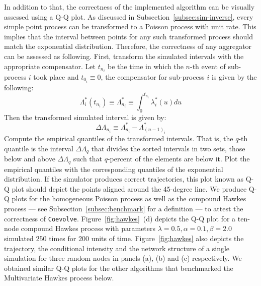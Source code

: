 \documentclass{juliacon}
\numberwithin{equation}{section}
\begin{document}
In addition to that, the correctness of the implemented algorithm can be visually assessed using a Q-Q plot. As discussed in Subsection~\ref{subsec:sim-inverse}, every simple point process can be transformed to a Poisson process with unit rate. This implies that the interval between points for any such transformed process should match the exponential distribution. Therefore, the correctness of any aggregator can be assessed as following. First, transform the simulated intervals with the appropriate compensator. Let \( t_{n_i} \) be the time in which the \( n \)-th event of sub-process \( i \) took place and \( t_{0_i} \equiv 0 \), the compensator for sub-process \( i \) is given by the following:
\begin{equation}
  \Lambda_i^\ast(t_{n_i}) \equiv \Lambda_{n_i}^\ast \equiv \int_0^{t_{n_i}} \lambda_i^\ast(u) du
\end{equation}
Then the transformed simulated interval is given by:
\begin{equation}
  \Delta \Lambda_{n_i} \equiv \Lambda_{n_i}^\ast - \Lambda_{(n-1)_i}^\ast
\end{equation}
Compute the empirical quantiles of the transformed intervals. That is, the \( q \)-th quantile is the interval \( \Delta \Lambda_q \) that divides the sorted intervals in two sets, those below and above \( \Delta \Lambda_q \) such that \( q \)-percent of the elements are below it. Plot the empirical quantiles with the corresponding quantiles of the exponential distribution. If the simulator produces correct trajectories, this plot known as Q-Q plot should depict the points aligned around the 45-degree line. We produce Q-Q plots for the homogeneous Poisson process as well as the compound Hawkes process --- see Subsection~\ref{subsec:benchmark} for a definition --- to attest the correctness of \texttt{Coevolve}. Figure~\ref{fig:hawkes}~(d) depicts the Q-Q plot for a ten-node compound Hawkes process with parameters \( \lambda = 0.5 , \alpha = 0.1 , \beta = 2.0 \) simulated \( 250 \) times for \( 200 \) units of time. Figure~\ref{fig:hawkes} also depicts the trajectory, the conditional intensity and the network structure of a single simulation for three random nodes in panels (a), (b) and (c) respectively. We obtained similar Q-Q plots for the other algorithms that benchmarked the Multivariate Hawkes process below.
\end{document}
